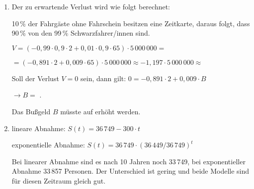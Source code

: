 \begin{langesbeispiel}
{\begin{enumerate}
	Mögliche Argumentationen:
	
	\begin{itemize}
		\item Die Wahrscheinlichkeit $p_1$ ist höchstens die Wahrscheinlichkeit, unter 18 Personen mindestens 1 Schwarzfahrer/in zu finden. Die Wahrscheinlichkeit $p_2$, bereits im Wagen der Linie 5 auf mindestens 1 Schwarzfahrer/in zu treffen, ist größer als die Wahrscheinlichkeit $p_1$, da die Wahrscheinlichkeit, unter 25 Kontrollierten eher 1 Schwarzfahrer/in anzu-
treffen, größer ist als unter 18 Kontrollierten.

\item Die Wahrscheinlichkeit $p_1$ ist höchstens die Wahrscheinlichkeit, unter 25 Personen keine Schwarzfahrerin/keinen Schwarzfahrer zu finden. Diese 
ist kleiner als 0,5. Die Wahrscheinlichkeit $p_2$ ist die Wahrscheinlichkeit, unter 25 Personen mindestens 1 Schwarzfahrer/in zu treffen. $p_2$ ist größer als 0,5, also $p_2>p_1$.
	\end{itemize}

		\item Der zu erwartende Verlust wird wie folgt berechnet:
		
		10\,\% der Fahrgäste ohne Fahrschein besitzen eine Zeitkarte, daraus folgt, dass 90\,\% von den 99\,\% Schwarzfahrer/innen sind.
		
		$V=(-0,99\cdot 0,9\cdot 2+0,01\cdot 0,9\cdot 65)\cdot 5\,000\,000=$
		
		$=(-0,891\cdot 2+0,009\cdot 65)\cdot 5\,000\,000\approx -1,197\cdot 5\,000\,000\approx$ 
		
		Soll der Verlust $V=0$ sein, dann gilt: $0=-0,891\cdot 2+0,009\cdot B$
		
		$\rightarrow B=$ .
		
		Das Bußgeld $B$ müsste auf  erhöht werden.
		
		\item lineare Abnahme: $S(t)=36\,749-300\cdot t$
		
		exponentielle Abnahme: $S(t)=36\,749\cdot (36\,449/36\,749)^t$
		
		Bei linearer Abnahme sind es nach 10 Jahren noch 33\,749, bei exponentieller Abnahme 33\,857 Personen. Der Unterschied ist gering und beide Modelle sind für diesen Zeitraum gleich gut.
		\end{enumerate}}
\end{langesbeispiel}